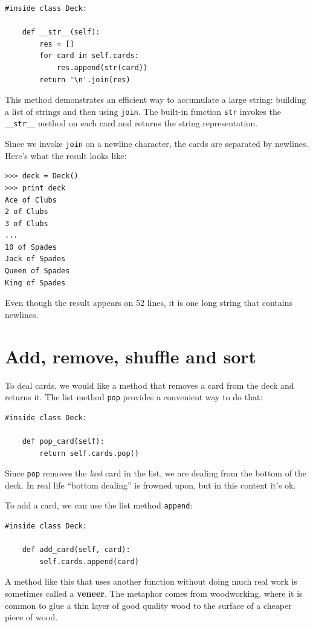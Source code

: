 \documentclass[10pt]{book}
\begin{document}
\begin{CJK}{UTF8}{gbsn}
\begin{verbatim}
#inside class Deck:

    def __str__(self):
        res = []
        for card in self.cards:
            res.append(str(card))
        return '\n'.join(res)
\end{verbatim}
%
This method demonstrates an efficient way to accumulate a large
string: building a list of strings and then using {\tt join}.
The built-in function {\tt str} invokes the \verb"__str__"
method on each card and returns the string representation.

Since we invoke {\tt join} on a newline character, the cards
are separated by newlines.  Here's what the result looks like:

\begin{verbatim}
>>> deck = Deck()
>>> print deck
Ace of Clubs
2 of Clubs
3 of Clubs
...
10 of Spades
Jack of Spades
Queen of Spades
King of Spades
\end{verbatim}
%
Even though the result appears on 52 lines, it is
one long string that contains newlines.


\section{Add, remove, shuffle and sort}

To deal cards, we would like a method that
removes a card from the deck and returns it.
The list method {\tt pop} provides a convenient way to do that:

\begin{verbatim}
#inside class Deck:

    def pop_card(self):
        return self.cards.pop()
\end{verbatim}
%
Since {\tt pop} removes the {\em last} card in the list, we are
dealing from the bottom of the deck.  In real life ``bottom dealing'' is
frowned upon,
but in this context it's ok.

To add a card, we can use the list method {\tt append}:

\begin{verbatim}
#inside class Deck:

    def add_card(self, card):
        self.cards.append(card)
\end{verbatim}
%
A method like this that uses another function without doing
much real work is sometimes called a {\bf veneer}.  The metaphor
comes from woodworking, where it is common to glue a thin
layer of good quality wood to the surface of a cheaper piece of
wood.


\end{CJK}
\end{document}
